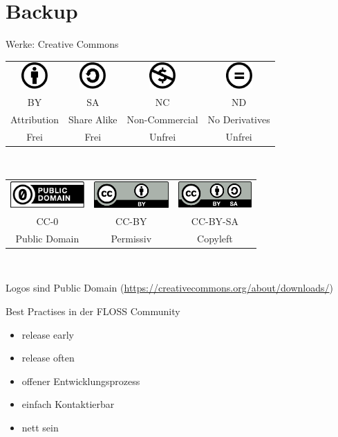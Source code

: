
\section{Backup}

\begin{frame}{Werke: Creative Commons}
	\begin{center}
	\begin{tabular}{cccc}
		\includegraphics[height=1cm]{res/by.pdf}
		&
		\includegraphics[height=1cm]{res/sa.pdf}
		&
		\includegraphics[height=1cm]{res/nc.pdf}
		&
		\includegraphics[height=1cm]{res/nd.pdf}
	\\
		BY
		&
		SA
		&
		NC
		&
		ND
	\\
		Attribution
		&
		Share Alike
		&
		Non-Commercial
		&
		No Derivatives
	\\
		Frei
		&
		Frei
		&
		Unfrei
		&
		Unfrei
	\end{tabular} 
	\\
	\vspace{1cm}
	\begin{tabular}{ccc}
		\includegraphics[height=1cm]{res/cc-zero.pdf}
		&
		\includegraphics[height=1cm]{res/cc-by.pdf}
		&
		\includegraphics[height=1cm]{res/cc-by-sa.pdf}
	\\
		CC-0
		&
		CC-BY
		&
		CC-BY-SA
	\\
		Public Domain
		&
		Permissiv
		&
		Copyleft
	\end{tabular} 
	\\
	\vspace{1cm}
	\end{center}
\end{frame}
\note
{
	Logos sind Public Domain (\url{https://creativecommons.org/about/downloads/})
}

\begin{frame}{Best Practises in der FLOSS Community}
	\begin{itemize}
		\item release early
		\item release often
		\item offener Entwicklungsprozess
		\item einfach Kontaktierbar
		\item nett sein
	\end{itemize}
\end{frame}
